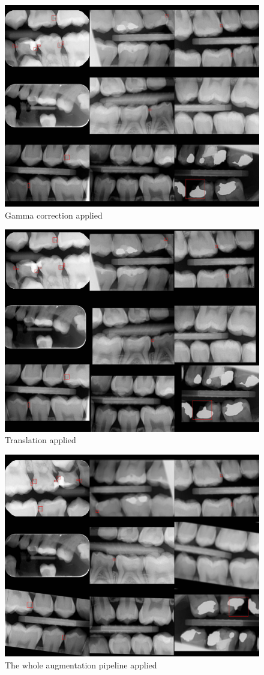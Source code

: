 \begin{figure}
    \includegraphics[width =0.8\linewidth]{images/random_gamma.jpg}
    \caption{Gamma correction applied}
\end{figure}
\begin{figure}
    \includegraphics[width =0.8\linewidth]{images/translate.jpg}
    \caption{Translation applied}
\end{figure}
\begin{figure}
    \includegraphics[width =0.8\linewidth]{images/all_transf.jpg}
    \caption{The whole augmentation pipeline applied}
\end{figure}


